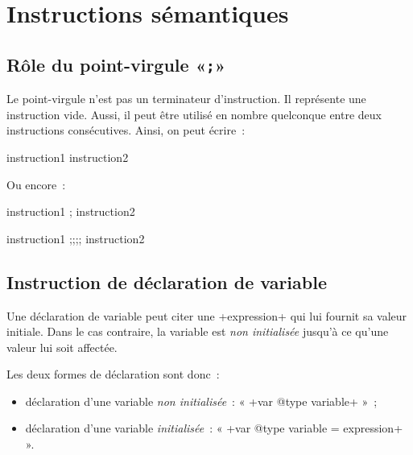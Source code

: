 
\chapter{Instructions sémantiques}






\section{Rôle du point-virgule «\texttt{;}»}

Le point-virgule n'est pas un terminateur d'instruction. Il représente une instruction vide. Aussi, il peut être utilisé en nombre quelconque entre deux instructions consécutives. Ainsi, on peut écrire~:

\begin{galgas4}
instruction1  instruction2
\end{galgas4}

Ou encore~:
\begin{galgas4}
instruction1 ; instruction2
\end{galgas4}
\begin{galgas4}
instruction1 ;;;; instruction2
\end{galgas4}







\section{Instruction de déclaration de variable}


Une déclaration de variable peut citer une \ggsq+expression+ qui lui fournit sa valeur initiale. Dans le cas contraire, la variable est \emph{non initialisée} jusqu'à ce qu'une valeur lui soit affectée.

Les deux formes de déclaration sont donc~:
\begin{itemize}
\item déclaration d'une variable \emph{non initialisée}~: « \ggsq+var @type variable+ »~;
\item déclaration d'une variable \emph{initialisée}~: « \ggsq+var @type variable = expression+ ».
\end{itemize}


